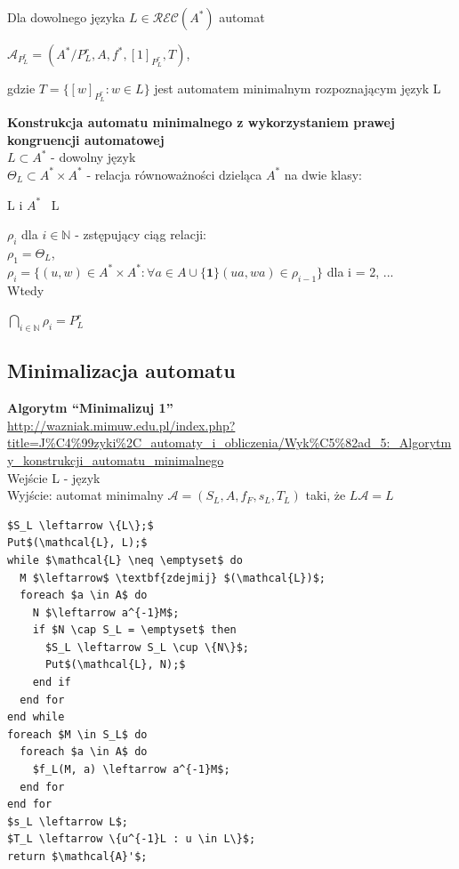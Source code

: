 \documentclass[12pt]{article}
\begin{document}
    \begin{definition}
    Dla dowolnego języka $L \in \mathcal{REC}(A^{*})$ automat
		\begin{center}
			$\mathcal{A}_{P_{L}^{r}} = (A^{*} / P_{L}^{r}, A, f^{*}, [1]_{P_{L}^{r}}, T)$,
		\end{center}
	gdzie $T = \{[w]_{P_{L}^{r}} : w \in L \}$ jest automatem minimalnym rozpoznającym język L
    \end{definition}
    \begin{definition}
    \textbf{Konstrukcja automatu minimalnego z wykorzystaniem prawej kongruencji automatowej} \\
	$L \subset A^{*}$ - dowolny język \\
	$\Theta_{L} \subset A^* \times A^*$ - relacja równoważności dzieląca $A^*$ na dwie klasy:
	\begin{center}
		L i $A^*$ \ L
    \end{center}
    $\rho_i$ dla $i \in \mathbb{N}$ - zstępujący ciąg relacji: \\
    $\rho_1 = \Theta_L$, \\
    $\rho_i = \{(u, w) \in A^* \times A^* : \forall a \in A \cup \{\textbf{1}\} (ua, wa) \in \rho_{i-1} \}$ dla i = 2, ... \\
    Wtedy
    \begin{center}
		$\bigcap\limits_{i \in \mathbb{N}} \rho_i = P^r_L$
	\end{center}
    \end{definition}
    
    
    \subsection{Minimalizacja automatu}
    \begin{definition}
    		\textbf{Algorytm ``Minimalizuj 1''} \\
    		\url{http://wazniak.mimuw.edu.pl/index.php?title=J\%C4\%99zyki\%2C_automaty_i_obliczenia/Wyk\%C5\%82ad_5:_Algorytmy_konstrukcji_automatu_minimalnego} \\
		Wejście L - język \\
        	Wyjście: automat minimalny $\mathcal{A} = (S_L, A, f_F, s_L, T_L)$ taki, że $L\mathcal{A} = L$
        	\begin{lstlisting}
$S_L \leftarrow \{L\};$
Put$(\mathcal{L}, L);$
while $\mathcal{L} \neq \emptyset$ do
  M $\leftarrow$ \textbf{zdejmij} $(\mathcal{L})$;
  foreach $a \in A$ do
    N $\leftarrow a^{-1}M$;
    if $N \cap S_L = \emptyset$ then
      $S_L \leftarrow S_L \cup \{N\}$;
      Put$(\mathcal{L}, N);$
    end if
  end for
end while
foreach $M \in S_L$ do
  foreach $a \in A$ do
    $f_L(M, a) \leftarrow a^{-1}M$;
  end for
end for
$s_L \leftarrow L$;
$T_L \leftarrow \{u^{-1}L : u \in L\}$;
return $\mathcal{A}'$;
	    	\end{lstlisting}
    \end{definition}
    
\end{document}
